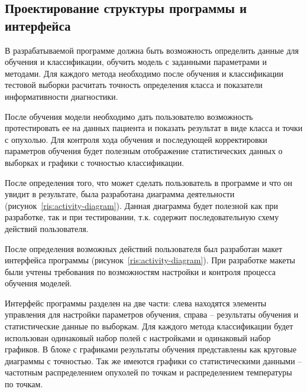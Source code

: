 \subsection{Проектирование структуры программы и интерфейса}
В разрабатываемой программе должна быть возможность определить данные для обучения и классификации, обучить модель с заданными параметрами и методами. Для каждого метода необходимо после обучения и классификации тестовой выборки расчитать точность определения класса и показатели информативности диагностики. 
\par
После обучения модели необходимо дать пользователю возможность протестировать ее на данных пациента и показать результат в виде класса и точки с опухолью. Для контроля хода обучения и последующей корректировки параметров обучения будет полезным отображение статистических данных о выборках и графики с точностью классификации.
\par
После определения того, что может сделать пользователь в программе и что он увидит в результате, была разработана диаграмма деятельности (рисунок~\ref{ris:activity-diagram}). Данная диаграмма будет полезной как при разработке, так и при тестировании, т.к. содержит последовательную схему действий пользователя.
\par
После определения возможных действий пользователя был разработан макет интерфейса программы (рисунок~\ref{ris:activity-diagram}). При разработке макеты были учтены требования по возможностям настройки и контроля процесса обучения моделей. 
\par
Интерфейс программы разделен на две части: слева находятся элементы управления для настройки параметров обучения, справа -- результаты обучения и статистические данные по выборкам. Для каждого метода классификации будет использован одинаковый набор полей с настройками и одинаковый набор графиков. В блоке с графиками результаты обучения представлены как круговые диаграммы с точностью. Так же имеются графики со статистическими данными -- частотным распределением опухолей по точкам и распределением температуры по точкам.


